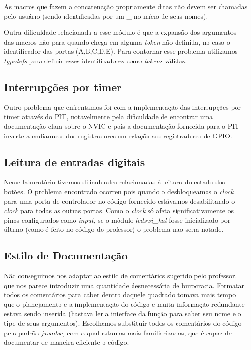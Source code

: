 \documentclass{article}
\begin{document}
As macros que fazem a concatenação propriamente ditas não devem ser chamadas pelo usuário (sendo identificadas por um \_ no início de seus nomes).

Outra dificuldade relacionada a esse módulo é que a expansão dos argumentos das macros não para quando chega em alguma \textit{token} não definida, no caso o identificador das portas (A,B,C,D,E). Para contornar esse problema utilizamos \textit{typedefs} para definir esses identificadores como \textit{tokens} válidas.

\subsection{Interrupções por timer}
Outro problema que enfrentamos foi com a implementação das interrupções por timer através do PIT, notavelmente pela dificuldade de encontrar uma documentação clara sobre o NVIC e pois a documentação fornecida para o PIT inverte a endianness dos registradores em relação aos registradores de GPIO.

\subsection{Leitura de entradas digitais}
Nesse laboratório tivemos dificuldades relacionadas à leitura do estado dos botões. O problema encontrado ocorreu pois quando o desbloqueamos o \textit{clock} para uma porta do controlador no código fornecido estávamos desabilitando o \textit{clock} para todas as outras portas. Como o \textit{clock} só afeta significativamente os pinos configurados como \textit{input}, se o módulo \textit{ledswi\_hal} fosse inicializado por último (como é feito no código do professor) o problema não seria notado.

\subsection{Estilo de Documentação}
Não conseguimos nos adaptar ao estilo de comentários sugerido pelo professor, que nos parece introduzir uma quantidade desnecessária de burocracia. Formatar todos os comentários para caber dentro daquele quadrado tomava mais tempo que o planejamento e a implementação do código e muita informação redundante estava sendo inserida (bastava ler a interface da função para saber seu nome e o tipo de seus argumentos). Escolhemos substituir todos os comentários do código pelo padrão \textit{javadoc}, com o qual estamos mais familiarizados, que é capaz de documentar de maneira eficiente o código.
\end{document}
